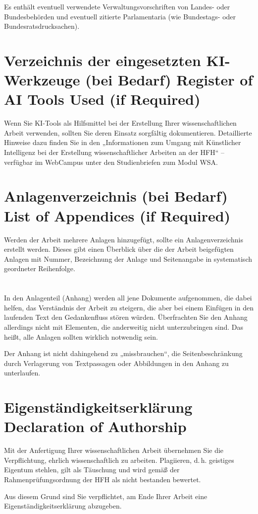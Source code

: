 Es enthält eventuell verwendete Verwaltungsvorschriften von Landes- oder
Bundesbehörden und eventuell zitierte Parlamentaria (wie Bundestags- oder
Bundesratsdrucksachen).

\section{\DEEN
  {Verzeichnis der eingesetzten KI-Werkzeuge (bei Bedarf)}
  {Register of AI Tools Used (if Required)}}

Wenn Sie KI-Tools als Hilfsmittel bei der Erstellung Ihrer wissenschaftlichen
Arbeit verwenden, sollten Sie deren Einsatz sorgfältig dokumentieren.
Detaillierte Hinweise dazu finden Sie in den „Informationen zum Umgang mit
Künstlicher Intelligenz bei der Erstellung wissenschaftlicher Arbeiten an
der HFH“ -- verfügbar im WebCampus unter den Studienbriefen zum Modul WSA.

\section{\DEEN
  {Anlagenverzeichnis (bei Bedarf)}
  {List of Appendices (if Required)}}

Werden der Arbeit mehrere Anlagen hinzugefügt, sollte ein Anlagenverzeichnis
erstellt werden. Dieses gibt einen Überblick über die der Arbeit beigefügten
Anlagen mit Nummer, Bezeichnung der Anlage und Seitenangabe in systematisch
geordneter Reihenfolge.

\section{}

In den Anlagenteil (Anhang) werden all jene Dokumente aufgenommen, die dabei
helfen, das Verständnis der Arbeit zu steigern, die aber bei einem Einfügen
in den laufenden Text den Gedankenfluss stören würden. Überfrachten Sie den
Anhang allerdings nicht mit Elementen, die anderweitig nicht unterzubringen
sind. Das heißt, alle Anlagen sollten wirklich notwendig sein.

Der Anhang ist nicht dahingehend zu „missbrauchen“, die Seitenbeschränkung
durch Verlagerung von Textpassagen oder Abbildungen in den Anhang zu
unterlaufen.

\section{\DEEN
  {Eigenständigkeitserklärung}
  {Declaration of Authorship}}

Mit der Anfertigung Ihrer wissenschaftlichen Arbeit übernehmen Sie die
Verpflichtung, ehrlich wissenschaftlich zu arbeiten. Plagiieren, d.\,h.
geistiges Eigentum stehlen, gilt als Täuschung und wird gemäß der
Rahmenprüfungsordnung der HFH als nicht bestanden bewertet.

Aus diesem Grund sind Sie verpflichtet, am Ende Ihrer Arbeit eine
Eigenständigkeitserklärung abzugeben.


